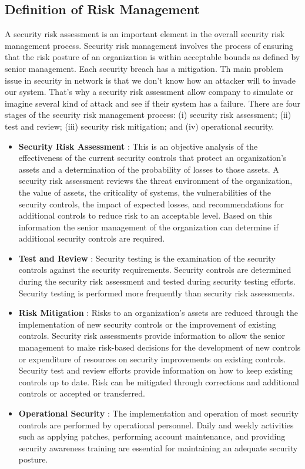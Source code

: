 \documentclass[twosided,a4,10pt]{article}
\begin{document}
\begin{multicols}{2}
\subsection{Definition of Risk Management}
A security risk assessment is an important element in the overall security risk
management process. Security risk management involves the process of ensuring
that the risk posture of an organization is within acceptable bounds as defined by
senior management. Each security breach has a mitigation. Th main problem issue in security in network is that we don't know how an attacker will to invade our system. That's why a security risk assessment allow company to simulate or imagine several kind of attack and see if their system has a failure.\newline
There are four stages of the security risk management process:
(i) security risk assessment; (ii) test and review; (iii) security risk mitigation; and (iv) operational security.
\begin{itemize}
    \item \textbf{Security Risk Assessment} : This is an objective analysis of the effectiveness of the current security controls that protect an organization’s assets and a
    determination of the probability of losses to those assets. A security risk
    assessment reviews the threat environment of the organization, the value of
    assets, the criticality of systems, the vulnerabilities of the security controls,
    the impact of expected losses, and recommendations for additional controls
    to reduce risk to an acceptable level. Based on this information the senior
    management of the organization can determine if additional security
    controls are required.
    \item \textbf{Test and Review} : Security testing is the examination of the security
    controls against the security requirements. Security controls are determined
    during the security risk assessment and tested during security testing efforts.
    Security testing is performed more frequently than security risk assessments.
    \item \textbf{Risk Mitigation} : Risks to an organization’s assets are reduced through
    the implementation of new security controls or the improvement of existing
    controls. Security risk assessments provide information to allow the
    senior management to make risk-based decisions for the development of
    new controls or expenditure of resources on security improvements on existing controls. Security test and review efforts provide information on
    how to keep existing controls up to date. Risk can be mitigated through
    corrections and additional controls or accepted or transferred.
    \item \textbf{Operational Security} : The implementation and operation of most
    security controls are performed by operational personnel. Daily and weekly
    activities such as applying patches, performing account maintenance, and
    providing security awareness training are essential for maintaining an
    adequate security posture.
\end{itemize}


\end{multicols}
\end{document}
